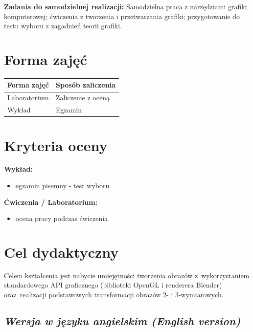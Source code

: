 \documentclass[12pt, a4paper]{article}
\newcommand{\thdrule}{\noalign{\global\setlength{\extrarowheight}{0pt}}}
\newcommand{\thdend}{\noalign{\global\setlength{\extrarowheight}{3pt}}}
\begin{document}
\vspace{4pt}
\noindent\textbf{Zadania do samodzielnej realizacji:} Samodzielna praca z narzędziami grafiki komputerowej; ćwiczenia z tworzenia i przetwarzania grafiki; przygotowanie do testu wyboru z zagadnień teorii grafiki.

\section{Forma zajęć}

\begin{center}
{\scriptsize
\begin{tabular}{m{5cm}m{8cm}}
\thdrule\toprule
\rowcolor{pjatkRed} {\color{white}\textbf{Forma zajęć}} & {\color{white}\textbf{Sposób zaliczenia}} \\
\midrule\thdend
  \rowcolor{tableRowLight} Laboratorium & Zaliczenie z oceną \\
  \rowcolor{tableRowAlt} Wykład & Egzamin \\
\bottomrule
\end{tabular}}
\end{center}

\section{Kryteria oceny}

\textbf{Wykład:}
\begin{itemize}
  \item egzamin pisemny - test wyboru
\end{itemize}
\vspace{4pt}
\textbf{Ćwiczenia / Laboratorium:}
\begin{itemize}
  \item ocena pracy podczas ćwiczenia
\end{itemize}


\section{Cel dydaktyczny}

Celem kształcenia jest nabycie umiejętności tworzenia obrazów z wykorzystaniem standardowego API graficznego (biblioteki OpenGL i renderera Blender) oraz realizacji podstawowych transformacji obrazów 2- i 3-wymiarowych.

\subsection*{\textit{Wersja w języku angielskim (English version)}}
\end{document}
